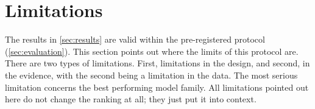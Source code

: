 %
%
\section{Limitations}
\label{sec:limitations}
The results in \cref{sec:results} are valid within the pre-registered protocol (\cref{sec:evaluation}). This section points out where the limits of this protocol are. There are two types of limitations. First, limitations in the design, and second, in the evidence, with the second being a limitation in the data. The most serious limitation concerns the best performing model family. All limitations pointed out here do not change the ranking at all; they just put it into context.

